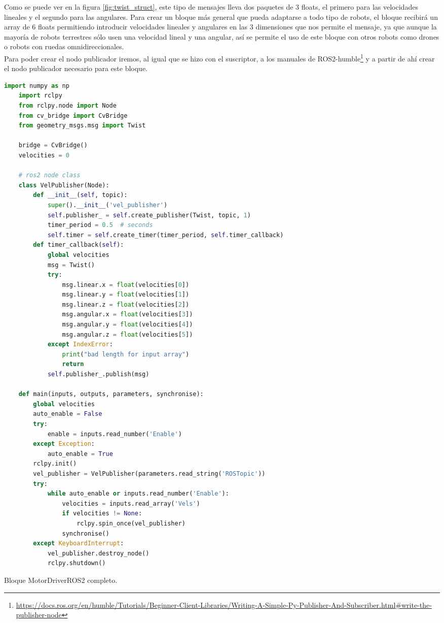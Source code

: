 Como se puede ver en la figura \ref{fig:twist_struct}, este tipo de mensajes lleva dos paquetes de 3 floats, el primero para las velocidades
lineales y el segundo para las angulares. Para crear un bloque más general que pueda adaptarse a todo tipo de robots, el bloque recibirá un array
de 6 floats permitiendo introducir velocidades lineales y angulares en las 3 dimensiones que nos permite el mensaje, ya que aunque la mayoría de
robots terrestres sólo usen una velocidad lineal y una angular, así se permite el uso de este bloque con otros robots como drones o robots con ruedas
omnidireccionales.\\

Para poder crear el nodo publicador iremos, al igual que se hizo con el suscriptor, a los manuales de
ROS2-humble\footnote{\url{https://docs.ros.org/en/humble/Tutorials/Beginner-Client-Libraries/Writing-A-Simple-Py-Publisher-And-Subscriber.html\#write-the-publisher-node}}
y a partir de ahí crear el nodo publicador necesario para este bloque.

\begin{code}[H]
  \begin{lstlisting}[language=python]
    import numpy as np
    import rclpy
    from rclpy.node import Node
    from cv_bridge import CvBridge
    from geometry_msgs.msg import Twist

    bridge = CvBridge()
    velocities = 0

    # ros2 node class
    class VelPublisher(Node):
        def __init__(self, topic):
            super().__init__('vel_publisher')
            self.publisher_ = self.create_publisher(Twist, topic, 1)
            timer_period = 0.5  # seconds
            self.timer = self.create_timer(timer_period, self.timer_callback)
        def timer_callback(self):
            global velocities
            msg = Twist()
            try:
                msg.linear.x = float(velocities[0])
                msg.linear.y = float(velocities[1])
                msg.linear.z = float(velocities[2])
                msg.angular.x = float(velocities[3])
                msg.angular.y = float(velocities[4])
                msg.angular.z = float(velocities[5])
            except IndexError:
                print("bad length for input array")
                return
            self.publisher_.publish(msg)

    def main(inputs, outputs, parameters, synchronise):
        global velocities
        auto_enable = False
        try:
            enable = inputs.read_number('Enable')
        except Exception:
            auto_enable = True
        rclpy.init()
        vel_publisher = VelPublisher(parameters.read_string('ROSTopic'))
        try:
            while auto_enable or inputs.read_number('Enable'):
                velocities = inputs.read_array('Vels')
                if velocities != None:
                    rclpy.spin_once(vel_publisher)
                synchronise()
        except KeyboardInterrupt:
            vel_publisher.destroy_node()
            rclpy.shutdown()
  \end{lstlisting}
  \caption[Bloque MotorDriverROS2]{Bloque MotorDriverROS2 completo.}
  \label{cod:motordriverros2_all}
\end{code}

